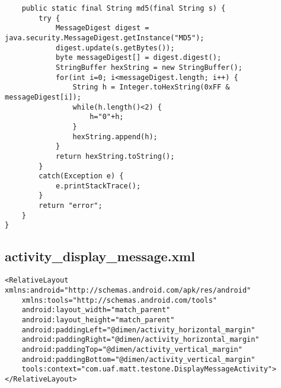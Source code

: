 \begin{lstlisting}
    public static final String md5(final String s) {
        try {
            MessageDigest digest = java.security.MessageDigest.getInstance("MD5");
            digest.update(s.getBytes());
            byte messageDigest[] = digest.digest();
            StringBuffer hexString = new StringBuffer();
            for(int i=0; i<messageDigest.length; i++) {
                String h = Integer.toHexString(0xFF & messageDigest[i]);
                while(h.length()<2) {
                    h="0"+h;
                }
                hexString.append(h);
            }
            return hexString.toString();
        }
        catch(Exception e) {
            e.printStackTrace();
        }
        return "error";
    }
}
\end{lstlisting}
\subsection{activity\_display\_message.xml}
\label{app:camessagexml}
\begin{lstlisting}
<RelativeLayout xmlns:android="http://schemas.android.com/apk/res/android"
    xmlns:tools="http://schemas.android.com/tools"
    android:layout_width="match_parent"
    android:layout_height="match_parent"
    android:paddingLeft="@dimen/activity_horizontal_margin"
    android:paddingRight="@dimen/activity_horizontal_margin"
    android:paddingTop="@dimen/activity_vertical_margin"
    android:paddingBottom="@dimen/activity_vertical_margin"
    tools:context="com.uaf.matt.testone.DisplayMessageActivity">
</RelativeLayout>
\end{lstlisting}
